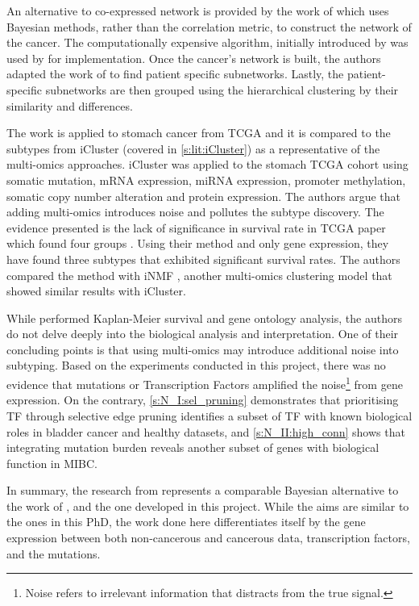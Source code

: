 An alternative to co-expressed network is provided by the work of \citet{Nakazawa2021-yq} which uses Bayesian methods, rather than the correlation metric, to construct the network of the cancer. The computationally expensive algorithm, initially introduced by \citet{Imoto2001-uc} was used by \citet{Tamada2011-ok} for implementation. Once the cancer’s network is built, the authors adapted the work of \citet{Tanaka2020-mw} to find patient specific subnetworks. Lastly, the patient-specific subnetworks are then grouped using the hierarchical clustering by their similarity and differences.

The work is applied to stomach cancer from TCGA and it is compared to the subtypes from iCluster \citep{Shen2009-ew} (covered in \cref{s:lit:iCluster}) as a representative of the multi-omics approaches. iCluster was applied to the stomach TCGA cohort using somatic mutation, mRNA expression, miRNA expression, promoter methylation, somatic copy number alteration and protein expression. The authors \citet{Nakazawa2021-yq} argue that adding multi-omics introduces noise and pollutes the subtype discovery. The evidence presented is the lack of significance in survival rate in TCGA paper which found four groups \citep{Cancer_Genome_Atlas_Research_Network2014-xp}. Using their method and only gene expression, they have found three subtypes that exhibited significant survival rates. The authors compared the method with iNMF \citep{Yang2016-dm}, another multi-omics clustering model that showed similar results with iCluster.

While \cite{Nakazawa2021-yq} performed Kaplan-Meier survival and gene ontology analysis, the authors do not delve deeply into the biological analysis and interpretation. One of their concluding points is that using multi-omics may introduce additional noise into subtyping. Based on the experiments conducted in this project, there was no evidence that mutations or Transcription Factors amplified the noise\footnote{Noise refers to irrelevant information that distracts from the true signal.} from gene expression. On the contrary, \cref{s:N_I:sel_pruning} demonstrates that prioritising TF through selective edge pruning identifies a subset of TF with known biological roles in bladder cancer and healthy datasets, and \cref{s:N_II:high_conn} shows that integrating mutation burden reveals another subset of genes with biological function in MIBC.


In summary, the research from \citet{Nakazawa2021-yq} represents a comparable Bayesian alternative to the work of \citet{Care2019-ij}, and the one developed in this project. While the aims are similar to the ones in this PhD, the work done here differentiates itself by the gene expression between both non-cancerous and cancerous data, transcription factors, and the mutations.


